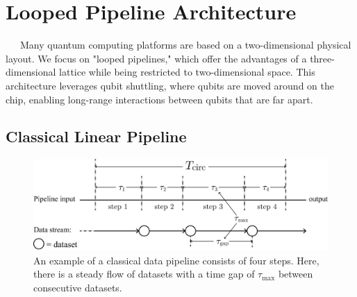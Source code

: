 \documentclass[a4paper,11pt]{ltjsarticle}
\begin{document}
\section{Looped Pipeline Architecture}\label{looped_pipeline}{
    \ \ \ Many quantum computing platforms are based on a two-dimensional physical layout. We focus on "looped pipelines," \cite{cai2023} which offer the advantages of a three-dimensional lattice while being restricted to two-dimensional space. This architecture leverages qubit shuttling, where qubits are moved around on the chip, enabling long-range interactions between qubits that are far apart. 

    \subsection{Classical Linear Pipeline}{

        \begin{figure}[h]
            \centering
            \includegraphics[scale=0.40]{figure/classical_pipeline.eps}
            \vspace{-20pt}\caption{An example of a classical data pipeline consists of four steps. Here, there is a steady flow of datasets with a time gap of $\tau_{\max}$ between consecutive datasets.}
            \label{classical_pipeline}
            \vspace{-10pt}
        \end{figure}

}}
\end{document}
